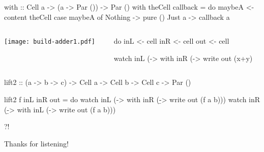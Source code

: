 \documentclass[UKenglish,usenames,dvipsnames,svgnames,table,aspectratio=169,mathserif]{beamer}
\newcommand{\nl}{\vspace{\baselineskip}}
\begin{document}
\begin{frame}[fragile]
\begin{haskellcode}
          with :: Cell a -> (a -> Par ()) -> Par ()
          with theCell callback = do
            maybeA <- content theCell
              case maybeA of
                Nothing -> pure ()
                Just a  -> callback a
\end{haskellcode}
\end{frame}


\begin{frame}[fragile]
\centering

\begin{columns}
\begin{column}{0.5\textwidth}
\begin{overlayarea}{0.5\textwidth}{0.4\textheight}
\texttt{[image: build-adder1.pdf]}
\end{overlayarea}
\end{column}
\begin{column}{0.5\textwidth}
\begin{haskellcode}
do
  inL  <- cell
  inR  <- cell
  out  <- cell
\end{haskellcode}
\nl
\begin{haskellcode}
  watch inL (\x ->
    with inR (\y ->
      write out (x+y)
\end{haskellcode}
\end{column}
\end{columns}
\end{frame}


\begin{frame}[fragile]
\begin{haskellcode}
          lift2 :: (a -> b -> c)
                -> Cell a -> Cell b -> Cell c
                -> Par ()
\end{haskellcode}
\pause
\begin{haskellcode}
          lift2 f inL inR out = do
            watch inL (\a ->
              with inR (\b ->
                write out (f a b)))
            watch inR (\b ->
              with inL (\a ->
                write out (f a b)))
\end{haskellcode}

\end{frame}


\begin{frame}
\centering
\fontsize{60}{70}\selectfont ?!

\end{frame}

\begin{frame}
\huge \centering
Thanks for listening!
\end{frame}
\end{document}
